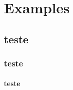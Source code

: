 
\chapter{Examples}
\label{chap:examples}

\section{teste}
\subsection{teste}
\subsubsection{teste}








